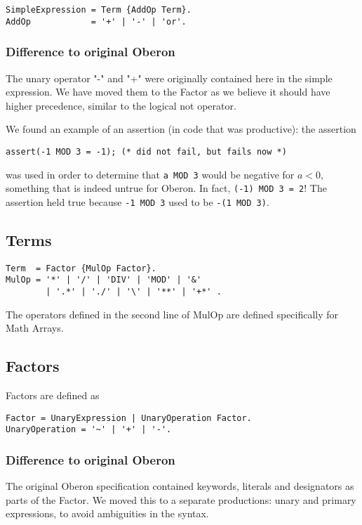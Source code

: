 \documentclass[a4wide,11pt]{article}
\begin{document}
\begin{lstlisting}[style=ebnf]
SimpleExpression = Term {AddOp Term}.
AddOp            = '+' | '-' | 'or'.
\end{lstlisting}

\begin{annotation}
\subsubsection{Difference to original Oberon}
The unary operator "-" and "+" were originally contained here in the simple expression.
We have moved them to the Factor as we believe it should have higher precedence, similar to the logical not operator.

We found an example of an assertion (in code that was productive): the assertion
\begin{lstlisting}[style=example]
	assert(-1 MOD 3 = -1); (* did not fail, but fails now *)
\end{lstlisting}
was used in order to determine that \lstinline"a MOD 3" would be negative for $a<0$, something that is indeed untrue for Oberon.
In fact, \lstinline"(-1) MOD 3 = 2"!
The assertion held true because \lstinline"-1 MOD 3" used to be \lstinline"-(1 MOD 3)".
\end{annotation}

\subsection{Terms}
\begin{lstlisting}[style=ebnf]
Term  = Factor {MulOp Factor}.
MulOp = '*' | '/' | 'DIV' | 'MOD' | '&'
        | '.*' | './' | '\' | '**' | '+*' .
\end{lstlisting}
The operators defined in the second line of MulOp are defined specifically for Math Arrays.


\subsection{Factors}

Factors are defined as
\begin{lstlisting}[style=ebnf]
Factor = UnaryExpression | UnaryOperation Factor.
UnaryOperation = '~' | '+' | '-'.
\end{lstlisting}


\begin{annotation}
\subsubsection{Difference to original Oberon}
The original Oberon specification contained keywords, literals and designators as parts of the Factor.
We moved this to a separate productions: unary and primary expressions, to avoid ambiguities in the syntax.
\end{annotation}
\end{document}
